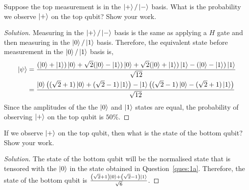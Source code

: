 \begin{solution}[label=ques:1a]
  \begin{question}
    Suppose the top measurement is in the $\ket{+}/\ket{-}$ basis.
What is the probability we observe $\ket{+}$ on the top qubit?
Show your work.
  \end{question}
  \tcblower{}
  \begin{proof}[Solution]
    Measuring in the $\ket{+}/\ket{-}$ basis is the same as applying a $H$ gate and then measuring in the $\ket{0}/\ket{1}$ basis. Therefore, the equivalent state before measurement in the $\ket{0}/\ket{1}$ basis is,
    \begin{equation}
      \begin{split}
        \ket{\psi} &= \frac{(\ket{0} + \ket{1})\ket{0} + \sqrt{2}(\ket{0} - \ket{1})\ket{0} + \sqrt{2}(\ket{0} + \ket{1})\ket{1} - (\ket{0} - \ket{1})\ket{1}}{\sqrt{12}}\\
        &= \frac{\ket{0}\left((\sqrt{2} + 1)\ket{0} + (\sqrt{2} - 1)\ket{1}\right) - \ket{1}\left((\sqrt{2} - 1)\ket{0} - (\sqrt{2} + 1)\ket{1}\right)}{\sqrt{12}}
      \end{split}
    \end{equation}
    Since the amplitudes of the the $\ket{0}$ and $\ket{1}$ states are equal, the probability of observing $\ket{+}$ on the top qubit is $50\%$.
  \end{proof}
\end{solution}

\begin{solution}[label=ques:1b]
  \begin{question}
    If we observe $\ket{+}$ on the top qubit, then what is the state of the bottom qubit? Show your work.
  \end{question}
  \tcblower{}
  \begin{proof}[Solution]
    The state of the bottom qubit will be the normalised state that is tensored with the $\ket{0}$ in the state obtained in Question~\ref{ques:1a}. Therefore, the state of the bottom qubit is $\frac{\left(\sqrt{2} + 1\right)\ket{0} + \left(\sqrt{2} - 1\right)\ket{1}}{\sqrt{6}}$.
  \end{proof}
\end{solution}

